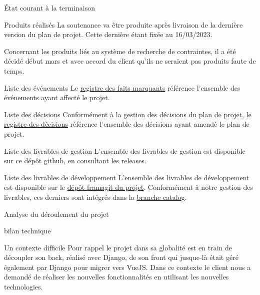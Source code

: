 \documentclass[]{article}
\begin{document}
{\begin{section}{État courant à la terminaison}
\begin{subsection}{Produits réalisés}
     La soutenance va être produite après livraison de la dernière version du plan de projet. Cette dernière étant fixée au 16/03/2023.

     Concernant les produits liés au système de recherche de contraintes, il a été décidé début mars et avec accord du client qu’ils ne seraient pas produits faute de temps.
 \end{subsection}

 \begin{subsection}{Liste des événements}
     Le \href{Registre_des_faits_marquants.pdf}{registre des faits marquants} référence l'ensemble des événements ayant affecté le projet.
 \end{subsection}

 \begin{subsection}{Liste des décisions}
     Conformément à la gestion des décisions du plan de projet, le \href{Registre_des_décisions.pdf}{registre des décisions} référence l'ensemble des décisions ayant amendé le plan de projet.
 \end{subsection}

 \begin{subsection}{Liste des livrables de gestion}
     L'ensemble des livrables de gestion est disponible sur ce \href{https://github.com/Szyckaa/UE-PROJET-DOCS-GESTION}{dépôt github}, en consultant les releases.
 \end{subsection}

 \begin{subsection}{Liste des livrables de développement}
     L'ensemble des livrables de développement est disponible sur le \href{https://framagit.org/flopedt/FlOpEDT}{dépôt framagit du projet}. Conformément à notre gestion des livrables, ces derniers sont intégrés dans la \href{https://framagit.org/flopedt/FlOpEDT/-/tree/catalog}{branche catalog}.
 \end{subsection}
\end{section}

\newpage

\begin{section}{Analyse du déroulement du projet}
 \begin{subsection}{bilan technique}
     \begin{subsubsection}{Un contexte difficile}
         Pour rappel le projet dans sa globalité est en train de découpler son back, réalisé avec Django, de son front qui jusque-là était géré également par Django pour migrer vers VueJS. Dans ce contexte le client nous a demandé de réaliser les nouvelles fonctionnalités en utilisant les nouvelles technologies.


\end{subsubsection}
\end{subsection}
\end{section}}
\end{document}
